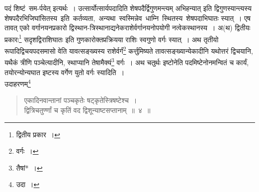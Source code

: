 \documentclass[10pt, openany]{book}
\begin{document}
{\newpage

{पदं शिष्टं~सम-र्पयेत् इत्यर्थः~। उत्सार्योत्सार्यपदादिति
शेषपदैर्द्विगुणमन्त्यम् अभिहन्यात् इति}
{द्विगुणस्यान्त्यस्य शेषपदैरभिजिघांसितस्य \,इति \,कर्तव्यता, \,अन्यथा \,स्वस्मिन्नेव \,धाम्नि \,स्थितस्य \,शेषपदाभिघातः स्यात्~। एष तावत् एको वर्गानयनप्रकारो
द्विस्थान-त्रिस्थानाद्यनेकराशेर्वर्गानयनोपयोगी नत्वेकस्थानस्य~। अ(थ) द्वितीयः प्रकारः\renewcommand{\thefootnote}{\s २}\footnote{\s द्वितीय प्रकार~।}
सदृशद्विराशिघातः इति}
{गुणकारोक्तप्रक्रियया राशिः स्वगुणो वर्गः स्यात्~। अथ तृतीयो
रूपादिद्विचयपदसमासो}
{वेति यावत्सङ्ख्यस्य राशेर्वर्गं\renewcommand{\thefootnote}{\s ३}\footnote{\s वर्गः~।} कर्त्तुमिष्यते
तावत्सङ्ख्यान्येकादीनि यथोत्तरं द्विचयानि,}
{यथैकं त्रीणि पञ्चेत्यादीनि, स्थाप्यानि तेषामैक्यं\renewcommand{\thefootnote}{\s ४}\footnote{\s तैषां*~।} वर्गः~। अथ
चतुर्थः इष्टोनेति पदमिष्टेनोनमन्वितं च कार्यं, तयोरन्योन्यघात इष्टस्य वर्गेण युतो वर्गः स्यादिति~।}\\

{उदाहरणम्\renewcommand{\thefootnote}{\s ५}\footnote{\s उदा~।}\textemdash}

\begin{quote}
{\eg एकादिनवान्तानां पञ्चकृतेः षट्कृतेस्त्रिषष्टेश्च~। \\
द्वित्रिचतुर्ण्णां च कृतिं वद द्विशून्याष्टसप्तानाम्~॥~४~॥}\end{quote}

}
\end{document}
